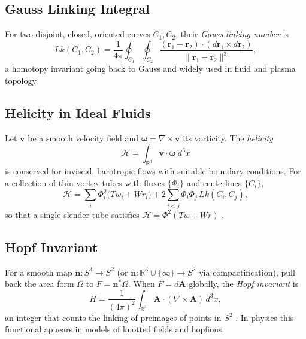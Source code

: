 \documentclass[11pt, a4paper]{article}
\begin{document}
\subsection{Gauss Linking Integral}
For two disjoint, closed, oriented curves \(C_1,C_2\), their \emph{Gauss linking number} is
\begin{equation}
    Lk(C_1,C_2) = \frac{1}{4\pi}\oint_{C_1}\!\!\oint_{C_2}
    \frac{(\mathbf r_1-\mathbf r_2)\cdot(d\mathbf r_1\times d\mathbf r_2)}
    {\lVert \mathbf r_1-\mathbf r_2\rVert^3},
    \label{eq:GaussLk}
\end{equation}
a homotopy invariant going back to Gauss and widely used in fluid and plasma topology.

\subsection{Helicity in Ideal Fluids}
Let \(\mathbf v\) be a smooth velocity field and \(\boldsymbol\omega=\nabla\times \mathbf v\) its vorticity. The \emph{helicity}
\begin{equation}
    \mathcal H = \int_{\mathbb{R}^3} \mathbf v\cdot \boldsymbol\omega \; d^3x
    \label{eq:helicity}
\end{equation}
is conserved for inviscid, barotropic flows with suitable boundary conditions. For a collection of thin vortex tubes with fluxes \(\{\Phi_i\}\) and centerlines \(\{C_i\}\),
\begin{equation}
    \mathcal H
    = \sum_{i} \Phi_i^2\big(Tw_i + Wr_i\big)
    + 2\sum_{i<j} \Phi_i\Phi_j\, Lk(C_i,C_j),
    \label{eq:thinTubeHelicity}
\end{equation}
so that a single slender tube satisfies \(\mathcal H = \Phi^2(Tw+Wr)\) \cite{MoffattRicca1992}.

\subsection{Hopf Invariant}
For a smooth map \(\mathbf n: S^3\to S^2\) (or \(\mathbf n:\mathbb{R}^3\cup\{\infty\}\to S^2\) via compactification), pull back the area form \(\Omega\) to \(F=\mathbf n^*\Omega\). When \(F=d\mathbf A\) globally, the \emph{Hopf invariant} is
\begin{equation}
    H = \frac{1}{(4\pi)^2}\int_{\mathbb{R}^3} \mathbf A\cdot(\nabla\times \mathbf A)\, d^3x,
    \label{eq:HopfInvariant}
\end{equation}
an integer that counts the linking of preimages of points in \(S^2\) \cite{Hopf1931,Whitehead1947}. In physics this functional appears in models of knotted fields and hopfions.
\end{document}

